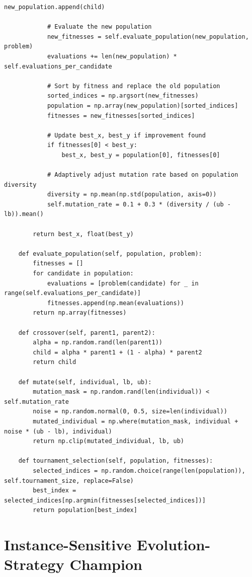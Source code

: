 \begin{lstlisting}[style=championprogram,caption={Complete generated \texttt{ImprovedNoisyGeneticAlgorithm} champion with five-observation averaging.},label={lst:generated_ga_complete}]
                new_population.append(child)

            # Evaluate the new population
            new_fitnesses = self.evaluate_population(new_population, problem)
            evaluations += len(new_population) * self.evaluations_per_candidate

            # Sort by fitness and replace the old population
            sorted_indices = np.argsort(new_fitnesses)
            population = np.array(new_population)[sorted_indices]
            fitnesses = new_fitnesses[sorted_indices]

            # Update best_x, best_y if improvement found
            if fitnesses[0] < best_y:
                best_x, best_y = population[0], fitnesses[0]

            # Adaptively adjust mutation rate based on population diversity
            diversity = np.mean(np.std(population, axis=0))
            self.mutation_rate = 0.1 + 0.3 * (diversity / (ub - lb)).mean()

        return best_x, float(best_y)

    def evaluate_population(self, population, problem):
        fitnesses = []
        for candidate in population:
            evaluations = [problem(candidate) for _ in range(self.evaluations_per_candidate)]
            fitnesses.append(np.mean(evaluations))
        return np.array(fitnesses)

    def crossover(self, parent1, parent2):
        alpha = np.random.rand(len(parent1))
        child = alpha * parent1 + (1 - alpha) * parent2
        return child

    def mutate(self, individual, lb, ub):
        mutation_mask = np.random.rand(len(individual)) < self.mutation_rate
        noise = np.random.normal(0, 0.5, size=len(individual))
        mutated_individual = np.where(mutation_mask, individual + noise * (ub - lb), individual)
        return np.clip(mutated_individual, lb, ub)

    def tournament_selection(self, population, fitnesses):
        selected_indices = np.random.choice(range(len(population)), self.tournament_size, replace=False)
        best_index = selected_indices[np.argmin(fitnesses[selected_indices])]
        return population[best_index]
\end{lstlisting}

\section{Instance-Sensitive Evolution-Strategy Champion}

